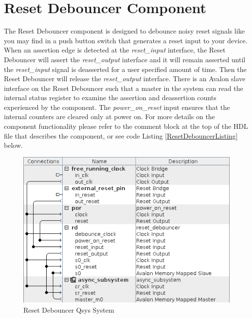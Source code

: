 \documentclass{article}
\begin{document}
\section*{Reset Debouncer Component}
\begin{flushleft}
\noindent
The Reset Debouncer component is designed to debounce noisy reset signals like you may find in a push button switch that generates a reset input to your device.  When an assertion edge is detected at the \emph{reset\_input} interface, the Reset Debouncer will assert the \emph{reset\_output} interface and it will remain asserted until the \emph{reset\_input} signal is deasserted for a user specified amount of time. Then the Reset Debouncer will release the \emph{reset\_output} interface. There is an Avalon slave interface on the Reset Debouncer such that a master in the system can read the internal status register to examine the assertion and deassertion counts experienced by the component.  The \emph{power\_on\_reset} input ensures that the internal counters are cleared only at power on.  For more details on the component functionality please refer to the comment block at the top of the HDL file that describes the component, or see code Listing \ref{ResetDebouncerListing} below.

\begin{figure}[H]
\centering
\includegraphics[scale=0.675]{rd_qsys}
\caption{Reset Debouncer Qsys System}
\label{fig:rd_qsys}
\end{figure}


\end{flushleft}
\end{document}
